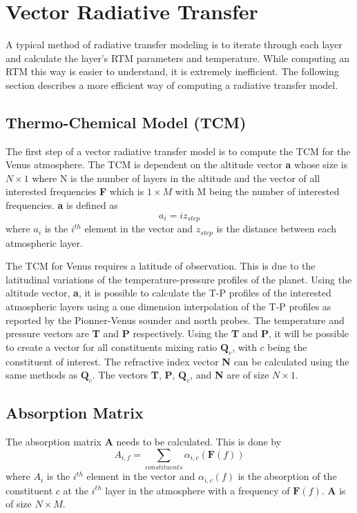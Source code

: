 \section{Vector Radiative Transfer}
A typical method of radiative transfer modeling is to iterate through each layer and calculate the layer's RTM parameters and temperature. 
While computing an RTM this way is easier to understand, it is extremely inefficient. The following section describes a more efficient way of computing a radiative transfer model.
\subsection{Thermo-Chemical Model (TCM)}
The first step of a vector radiative transfer model is to compute the TCM for the Venus atmosphere. The TCM is dependent on the altitude vector \textbf{a} whose size is $N\times 1$ where N is the number of layers in the altitude and the vector of all interested frequencies \textbf{F} which is $1 \times M$ with M being the number of interested frequencies. \textbf{a} is defined as
\begin{equation}
a_i = iz_{step}
\end{equation}
where $a_i$ is the $i^{th}$ element in the vector and $z_{step}$ is the distance between each atmospheric layer. 

The TCM for Venus requires a latitude of observation. This is due to the latitudinal variations of the temperature-pressure profiles of the planet. 
Using the altitude vector, \textbf{a}, it is possible to calculate the T-P profiles of the interested atmospheric layers using a one dimension interpolation of the T-P profiles as reported by the Pionner-Venus sounder and north probes. 
The temperature and pressure vectors are \textbf{T} and \textbf{P} respectively. Using the \textbf{T} and \textbf{P}, it will be possible to create a vector for all constituents mixing ratio $\textbf{Q}_{c}$, with $c$ being the constituent of interest. The refractive index vector \textbf{N} can be calculated using the same methods as $\textbf{Q}_{c}$. The vectors \textbf{T}, \textbf{P}, $\textbf{Q}_{c}$, and \textbf{N} are of size $N\times 1$.

\subsection{Absorption Matrix}
The absorption matrix \textbf{A} needs to be calculated. This is done by
\begin{equation}
A_{i,f} = \sum_{constituents} \alpha_{i,c}(\textbf{F}(f))
\end{equation}
where $A_i$ is the $i^{th}$ element in the vector and $\alpha_{i,c}(f)$ is the absorption of the constituent $c$ at the $i^{th}$ layer in the atmosphere with a frequency of $\textbf{F}(f)$. \textbf{A} is of size $N \times M$.

